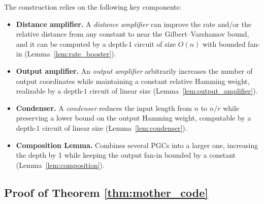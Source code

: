 \documentclass[11pt]{article}
\theoremstyle{named}
\begin{document}
The construction relies on the following key components:
\begin{itemize}
    \item \textbf{Distance amplifier.} A \emph{distance amplifier} can improve the rate and/or the relative distance from any constant to near the Gilbert--Varshamov bound, and it can be computed by a depth-1 circuit of size $O(n)$ with bounded fan-in (Lemma~\ref{lem:rate_booster}).
    
    
    \item \textbf{Output amplifier.} An \emph{output amplifier} arbitrarily increases the number of output coordinates while maintaining a constant relative Hamming weight, realizable by a depth-$1$ circuit of linear size (Lemma~\ref{lem:output_amplifier}).
    
    \item \textbf{Condenser.} A \emph{condenser} reduces the input length 
    from $n$ to $n/r$ while preserving a lower bound on the output Hamming 
    weight, computable by a depth-$1$ circuit of linear size 
    (Lemma~\ref{lem:condenser}).
    
    \item \textbf{Composition Lemma.} Combines several PGCs into a larger one, increasing the depth by 1 while keeping the output fan-in bounded by a constant (Lemma~\ref{lem:composition}).
\end{itemize}




\subsection{Proof of Theorem \ref{thm:mother_code}}
\end{document}

